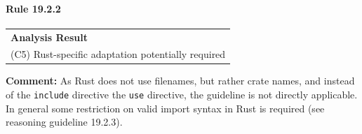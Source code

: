 \paragraph{Rule 19.2.2}
\begin{longtable}{p{13cm}}
\textbf{Analysis Result} \\
(C5) Rust-specific adaptation potentially required \\
\end{longtable}
\textbf{Comment:} As Rust does not use filenames, but rather crate names, and instead of the \texttt{include} directive the \texttt{use} directive, the guideline is not directly applicable. In general some restriction on valid import syntax in Rust is required (see reasoning guideline 19.2.3). \\

